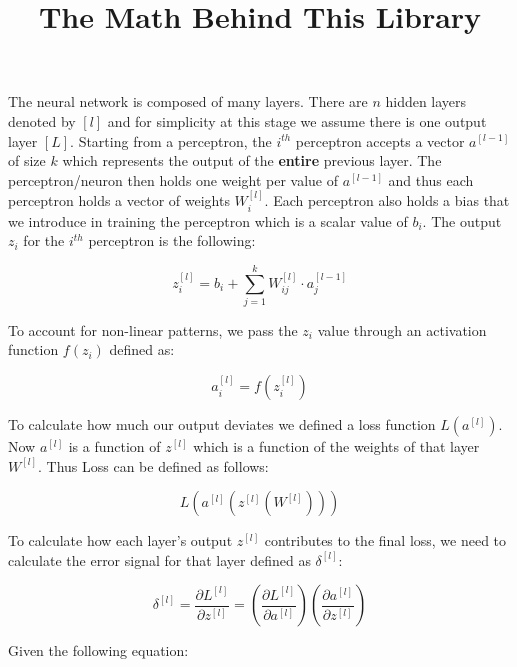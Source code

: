 \documentclass[11pt,a4paper]{article}
\begin{document}
\title{\textbf{\Large \color{primary} The Math Behind This Library}}
\author{}
\date{}
\maketitle

\vspace{-2em}

The neural network is composed of many layers. There are $n$ hidden layers denoted by $[l]$ and for simplicity at this stage we assume there is one output layer $[L]$. Starting from a perceptron, the $i^{th}$ perceptron accepts a vector $a^{[l-1]}$ of size $k$ which represents the output of the \textbf{entire} previous layer. The perceptron/neuron then holds one weight per value of $a^{[l-1]}$ and thus each perceptron holds a vector of weights $W_i^{[l]}$. Each perceptron also holds a bias that we introduce in training the perceptron which is a scalar value of $b_i$. The output $z_i$ for the $i^{th}$ perceptron is the following:

\begin{equation}
z_i^{[l]} = b_i + \sum_{j=1}^{k}{W_{ij}^{[l]} \cdot a_{j}^{[l-1]}}
\end{equation}

To account for non-linear patterns, we pass the $z_i$ value through an activation function $f(z_i)$ defined as:

\begin{equation}
a_i^{[l]} = f(z_i^{[l]})
\end{equation}

To calculate how much our output deviates we defined a loss function $L(a^{[l]})$. Now $a^{[l]}$ is a function of $z^{[l]}$ which is a function of the weights of that layer $W^{[l]}$. Thus Loss can be defined as follows:

\begin{equation}
L(a^{[l]}(z^{[l]}(W^{[l]})))
\end{equation}

To calculate how each layer's output $z^{[l]}$ contributes to the final loss, we need to calculate the error signal for that layer defined as $\delta^{[l]}$:

\begin{equation}
\delta^{[l]} = \frac{\partial{L^{[l]}}}{\partial{z^{[l]}}} = \left(\frac{\partial{L^{[l]}}}{\partial{a^{[l]}}}\right) \left(\frac{\partial{a^{[l]}}}{\partial{z^{[l]}}}\right)
\end{equation}

Given the following equation:
\end{document}

